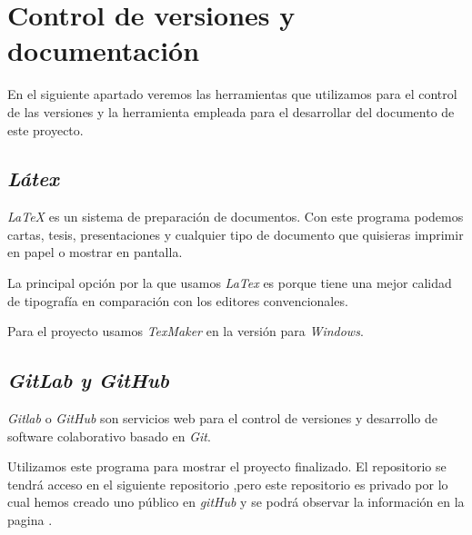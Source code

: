 \section{Control de versiones y documentación}

En el siguiente apartado veremos las herramientas que utilizamos para el control de las versiones y la herramienta empleada para el desarrollar del documento de este proyecto.

\subsection{\textit{Látex}}

\textit{LaTeX}\cite{latex} es un sistema de preparación de documentos. Con este programa podemos cartas, tesis, presentaciones y cualquier tipo de documento que quisieras imprimir en papel o mostrar en pantalla. 

La principal opción por la que usamos \textit{LaTex} es porque tiene una mejor calidad de tipografía en comparación con los editores convencionales.

Para el proyecto usamos \textit{TexMaker} en la versión para \textit{Windows}.

\subsection{\textit{GitLab y GitHub}}

\textit{Gitlab}\cite{gitlab} o \textit{GitHub}\cite{github} son servicios web para el control de versiones y desarrollo de software colaborativo basado en \textit{Git}.

Utilizamos este programa para mostrar el proyecto finalizado. El repositorio se tendrá acceso en el siguiente repositorio \cite{repositorio},pero este repositorio es privado por lo cual hemos creado uno público en \textit{gitHub} y se podrá observar la información en la pagina \cite{repositorio1}.


